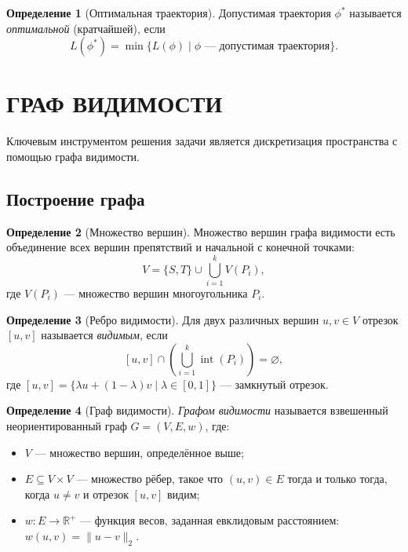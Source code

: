 \documentclass[intlimits,twoside,a4paper,11pt]{article}
\theoremstyle{definition}
\newtheorem{definition}{Определение}[section]
\begin{document}
\begin{definition}[Оптимальная траектория]
Допустимая траектория $\phi^*$ называется \textit{оптимальной} (кратчайшей), если
\[
L(\phi^*) = \min \{ L(\phi) \mid \phi \text{ --- допустимая траектория} \}.
\]
\end{definition}

\section{ГРАФ ВИДИМОСТИ}
\label{sec:visibility-graph}

Ключевым инструментом решения задачи является дискретизация пространства с помощью графа видимости.

\subsection{Построение графа}

\begin{definition}[Множество вершин]
Множество вершин графа видимости есть объединение всех вершин препятствий и начальной с конечной точками:
\[
V = \{S, T\} \cup \bigcup_{i=1}^k V(P_i),
\]
где $V(P_i)$ --- множество вершин многоугольника $P_i$.
\end{definition}

\begin{definition}[Ребро видимости]
Для двух различных вершин $u, v \in V$ отрезок $[u, v]$ называется \textit{видимым}, если
\[
[u, v] \cap \left( \bigcup_{i=1}^k \operatorname{int}(P_i) \right) = \varnothing,
\]
где $[u, v] = \{\lambda u + (1-\lambda)v \mid \lambda \in [0, 1]\}$ --- замкнутый отрезок.
\end{definition}

\begin{definition}[Граф видимости]
\textit{Графом видимости} называется взвешенный неориентированный граф $G = (V, E, w)$, где:
\begin{itemize}
    \item $V$ --- множество вершин, определённое выше;
    \item $E \subseteq V \times V$ --- множество рёбер, такое что $(u, v) \in E$ тогда и только тогда, когда $u \neq v$ и отрезок $[u, v]$ видим;
    \item $w: E \to \mathbb{R}^+$ --- функция весов, заданная евклидовым расстоянием: $w(u, v) = \|u - v\|_2$.
\end{itemize}
\end{definition}
\end{document}
